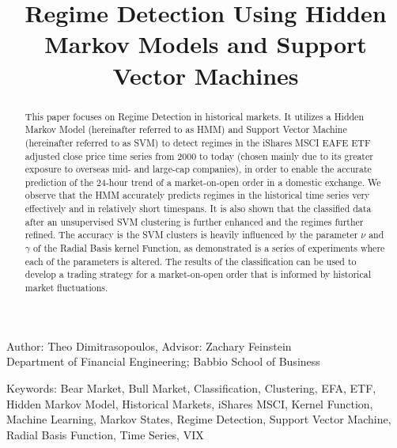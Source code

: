 \documentclass[]{hdsr}
\begin{document}
	
\begin{center}
\title{Regime Detection Using Hidden Markov Models and Support Vector Machines}
\maketitle
		
Author: Theo Dimitrasopoulos\upstairs{\affilone*}, Advisor: Zachary Feinstein\upstairs{\affilone**}\\
{\small \upstairs{\affilone}Department of Financial Engineering; Babbio School of Business}
		
\vspace{0.15in}

\begin{abstract}
This paper focuses on Regime Detection in historical markets. It utilizes a Hidden Markov Model (hereinafter referred to as HMM) and Support Vector Machine (hereinafter referred to as SVM) to detect regimes in the iShares MSCI EAFE ETF adjusted close price time series from 2000 to today (chosen mainly due to its greater exposure to overseas mid- and large-cap companies), in order to enable the accurate prediction of the 24-hour trend of a market-on-open order in a domestic exchange. We observe that the HMM accurately predicts regimes in the historical time series very effectively and in relatively short timespans. It is also shown that the classified data after an unsupervised SVM clustering is further enhanced and the regimes further refined. The accuracy is the SVM clusters is heavily influenced by the parameter $\nu$ and $\gamma$ of the Radial Basis kernel Function, as demonstrated is a series of experiments where each of the parameters is altered. The results of the classification can be used to develop a trading strategy for a market-on-open order that is informed by historical market fluctuations.
\end{abstract}
\end{center}

\vspace*{0.15in}
\small
Keywords: {Bear Market, Bull Market, Classification, Clustering, EFA, ETF, Hidden Markov Model, Historical Markets, iShares MSCI, Kernel Function, Machine Learning, Markov States, Regime Detection, Support Vector Machine, Radial Basis Function, Time Series, VIX}
\end{document}
